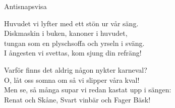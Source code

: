 \begin{song}{Antisnapsvisa}
	
	
	
	
	Huvudet vi lyfter med ett stön ur vår säng.\\
	Diskmaskin i buken, kanoner i huvudet,\\
	tungan som en plyschsoffa och yrseln i sväng.\\
	I ångesten vi svettas, kom sjung din refräng!
	
	Varför finns det aldrig någon nykter karneval?\\
	O, låt oss somna om så vi slipper våra kval!\\
	Men se, så många supar vi redan kastat upp i sängen:\\
	Renat och Skåne, Svart vinbär och Fager Bäsk!
	
\end{song}
